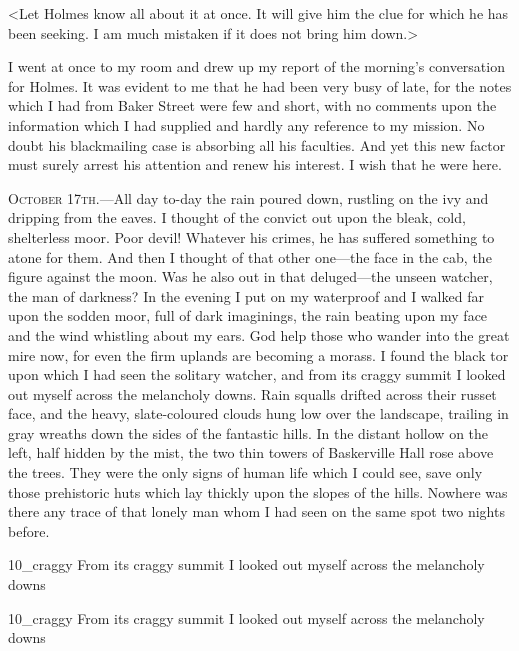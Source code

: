 <Let Holmes know all about it at once. It will give him the clue for which he has been seeking. I am much mistaken if it does not bring him down.>

I went at once to my room and drew up my report of the morning's conversation for Holmes. It was evident to me that he had been very busy of late, for the notes which I had from Baker Street were few and short, with no comments upon the information which I had supplied and hardly any reference to my mission. No doubt his blackmailing case is absorbing all his faculties. And yet this new factor must surely arrest his attention and renew his interest. I wish that he were here.

\divider

\textsc{October 17th.}—All day to-day the rain poured down, rustling on the ivy and dripping from the eaves. I thought of the convict out upon the bleak, cold, shelterless moor. Poor devil! Whatever his crimes, he has suffered something to atone for them. And then I thought of that other one—the face in the cab, the figure against the moon. Was he also out in that deluged—the unseen watcher, the man of darkness? In the evening I put on my waterproof and I walked far upon the sodden moor, full of dark imaginings, the rain beating upon my face and the wind whistling about my ears. God help those who wander into the great mire now, for even the firm uplands are becoming a morass. I found the black tor upon which I had seen the solitary watcher, and from its craggy summit I looked out myself across the melancholy downs. Rain squalls drifted across their russet face, and the heavy, slate-coloured clouds hung low over the landscape, trailing in gray wreaths down the sides of the fantastic hills. In the distant hollow on the left, half hidden by the mist, the two thin towers of Baskerville Hall rose above the trees. They were the only signs of human life which I could see, save only those prehistoric huts which lay thickly upon the slopes of the hills. Nowhere was there any trace of that lonely man whom I had seen on the same spot two nights before.
	
\begin{letter}
	\begin{bwbigpic}
			[1.0]  
		{10_craggy}
		{From its craggy summit I looked out myself across the melancholy downs}
	\end{bwbigpic}
\end{letter}
\begin{a4}
	\begin{bwbigpic}
		[1.0] 
		{10_craggy}
		{From its craggy summit I looked out myself across the melancholy downs}
	\end{bwbigpic}
\end{a4}

